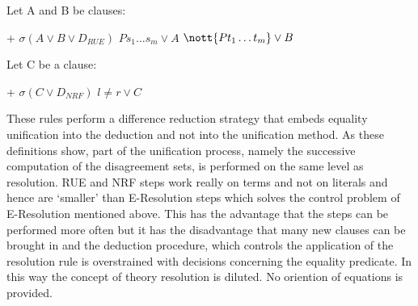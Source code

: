 \begin{Def}[RUE]
\return\vspace{-4mm}
\label{RUEResolution}

Let A and B be clauses:

\vspace{2mm}
\hlineblocktwo%
{+}%
{$\sigma(A \lor B \lor D_{RUE})$}%
{$Ps_1\ldots s_m \lor A$}%
{$\nott{Pt_1\ldots t_m} \lor B$}
\end{Def}

\begin{Def}[NRF]
\return\vspace{-4mm}
\label{NRFResolution}

Let C be a clause:

\vspace{2mm}
\hlineblockone%
{+}%
{$\sigma(C \lor D_{NRF})$}%
{$l\not=r \lor C$}


\end{Def}

These rules perform a difference reduction strategy that embeds
equality unification into
the deduction and not into the unification method.
As these definitions show, part of the unification
process, namely the successive computation
of the disagreement sets, is performed on the same 
level as resolution. RUE and NRF steps work really on
terms and not on literals and hence are `smaller'
than E-Resolution steps which solves the control 
problem of E-Resolution mentioned above. This has the
advantage that the steps can be performed
more often but it has the disadvantage that many
new clauses can be brought in and the deduction 
procedure, which controls the application
of the resolution rule is overstrained with decisions
concerning the equality predicate. In this way
the concept of theory resolution is diluted. No oriention of equations is
provided.

